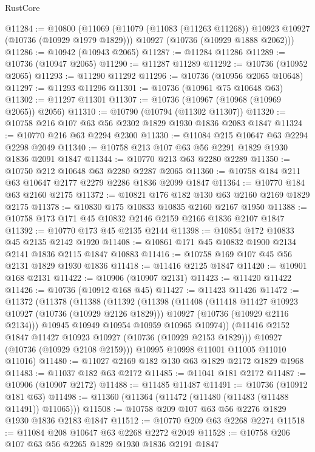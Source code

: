 \begin{lexlean}{RustCore}
\begin{coremodule}
@11284 := @10800
    (@11069
      (@11079 (@11083 (@11263 @11268)) @10923 @10927 (@10736 (@10929 @1979 @1829)))
      @10927
      (@10736 (@10929 @1888 @2062)))
@11286 := @10942 (@10943 @2065)
@11287 := @11284 @11286
@11289 := @10736 (@10947 @2065)
@11290 := @11287 @11289
@11292 := @10736 (@10952 @2065)
@11293 := @11290 @11292
@11296 := @10736 (@10956 @2065 @10648)
@11297 := @11293 @11296
@11301 := @10736 (@10961 @75 @10648 @63)
@11302 := @11297 @11301
@11307 := @10736 (@10967 (@10968 (@10969 @2065)) @2056)
@11310 := @10790 (@10794 (@11302 @11307))
@11320 := @10758 @216 @107 @63 @56 @2302 @1829 @1930 @1836 @2083 @1847
@11324 := @10770 @216 @63 @2294 @2300
@11330 := @11084 @215 @10647 @63 @2294 @2298 @2049
@11340 := @10758 @213 @107 @63 @56 @2291 @1829 @1930 @1836 @2091 @1847
@11344 := @10770 @213 @63 @2280 @2289
@11350 := @10750 @212 @10648 @63 @2280 @2287 @2065
@11360 := @10758 @184 @211 @63 @10647 @2177 @2279 @2286 @1836 @2099 @1847
@11364 := @10770 @184 @63 @2160 @2175
@11372 := @10821 @176 @182 @130 @63 @2160 @2169 @1829 @2175
@11378 := @10830 @175 @10833 @10835 @2160 @2167 @1950
@11388 := @10758 @173 @171 @45 @10832 @2146 @2159 @2166 @1836 @2107 @1847
@11392 := @10770 @173 @45 @2135 @2144
@11398 := @10854 @172 @10833 @45 @2135 @2142 @1920
@11408 := @10861 @171 @45 @10832 @1900 @2134 @2141 @1836 @2115 @1847 @10883
@11416 := @10758 @169 @107 @45 @56 @2131 @1829 @1930 @1836
@11418 := @11416 @2125 @1847
@11420 := @10901 @168 @2131
@11422 := @10906 (@10907 @2131)
@11423 := @11420 @11422
@11426 := @10736 (@10912 @168 @45)
@11427 := @11423 @11426
@11472 := @11372
    (@11378
      (@11388
        (@11392
          (@11398
            (@11408
              (@11418 @11427 @10923 @10927 (@10736 (@10929 @2126 @1829)))
              @10927
              (@10736 (@10929 @2116 @2134)))
            @10945
            @10949
            @10954
            @10959
            @10965
            @10974))
        (@11416 @2152 @1847 @11427 @10923 @10927 (@10736 (@10929 @2153 @1829)))
        @10927
        (@10736 (@10929 @2108 @2159)))
      @10995
      @10998
      @11001
      @11005
      @11010
      @11016)
@11480 := @11027 @2169 @182 @130 @63 @1829 @2172 @1829 @1968
@11483 := @11037 @182 @63 @2172
@11485 := @11041 @181 @2172
@11487 := @10906 (@10907 @2172)
@11488 := @11485 @11487
@11491 := @10736 (@10912 @181 @63)
@11498 := @11360 (@11364 (@11472 (@11480 (@11483 (@11488 @11491)) @11065)))
@11508 := @10758 @209 @107 @63 @56 @2276 @1829 @1930 @1836 @2183 @1847
@11512 := @10770 @209 @63 @2268 @2274
@11518 := @11084 @208 @10647 @63 @2268 @2272 @2049
@11528 := @10758 @206 @107 @63 @56 @2265 @1829 @1930 @1836 @2191 @1847

\end{coremodule}
\end{lexlean}
